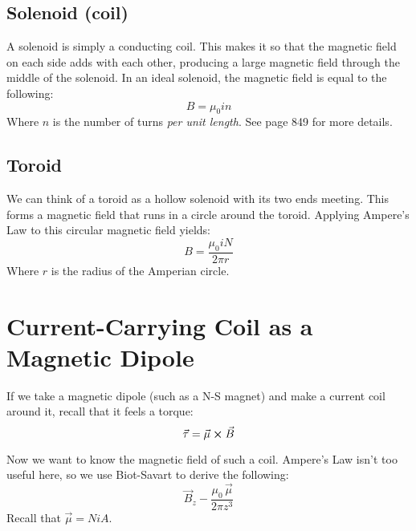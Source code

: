 \documentclass[]{article}
\begin{document}
\subsection{Solenoid (coil)}
A solenoid is simply a conducting coil. This makes it so that the magnetic field on each side adds with each other, producing a large magnetic field through the middle of the solenoid. In an ideal solenoid, the magnetic field is equal to the following:
\[ B = \mu_0 i n \]
Where $ n $ is the number of turns \emph{per unit length}. See page 849 for more details.

\subsection{Toroid}
We can think of a toroid as a hollow solenoid with its two ends meeting. This forms a magnetic field that runs in a circle around the toroid. Applying Ampere's Law to this circular magnetic field yields:
\[ B = \frac{\mu_0 i N}{2 \pi r} \]
Where $ r $ is the radius of the Amperian circle.

\section{Current-Carrying Coil as a Magnetic Dipole}
If we take a magnetic dipole (such as a N-S magnet) and make a current coil around it, recall that it feels a torque:
\[ \vec{\tau} = \vec{\mu} \cross \vec{B} \]

Now we want to know the magnetic field of such a coil. Ampere's Law isn't too useful here, so we use Biot-Savart to derive the following:
\[ \vec{B}_z - \frac{\mu_0 \, \vec{\mu}}{2\pi z^3} \]
Recall that $ \vec{\mu} = NiA $.
\end{document}
